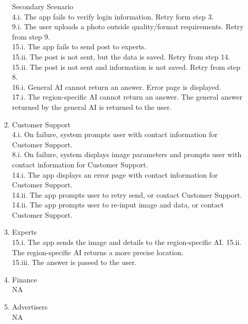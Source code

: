 \documentclass[]{article}
\begin{document}
\begin{enumerate}[{\bf BE1.}]
\begin{enumerate}[{\bf VP1.}]
                    Secondary Scenario \\
                    4.i. The app fails to verify login information. Retry form step 3. \\
                    9.i. The user uploads a photo outside quality/format requirements. Retry from step 9.\\ 
                    15.i. The app fails to send post to experts. \\
                    15.ii. The post is not sent, but the data is saved. Retry from step 14. \\
                    15.ii. The post is not sent and information is not saved. Retry from step 8. \\
                    16.i. General AI cannot return an answer. Error page is displayed. \\
                    17.i. The region-specific AI cannot return an answer. The general answer returned by the general AI is returned to the user.
                    
			\item Customer Support \\
				4.i. On failure, system prompts user with contact information for Customer Support. \\
                8.i. On failure, system displays image parameters and prompts user with contact information for Customer Support. \\
                14.i. The app displays an error page with contact information for Customer Support. \\
	            14.ii. The app prompts user to retry send, or contact Customer Support. \\
	            14.ii. The app prompts user to re-input image and data, or contact Customer Support. \\

            \item Experts\\
                15.i. The app sends the image and details to the region-specific AI. 
                15.ii. The region-specific AI returns a more precise location. \\
                15.iii. The answer is passed to the user.
            
            \item Finance \\
            NA
            \item Advertisers\\
            NA \\
		\end{enumerate}
        

\end{enumerate}
\end{document}
